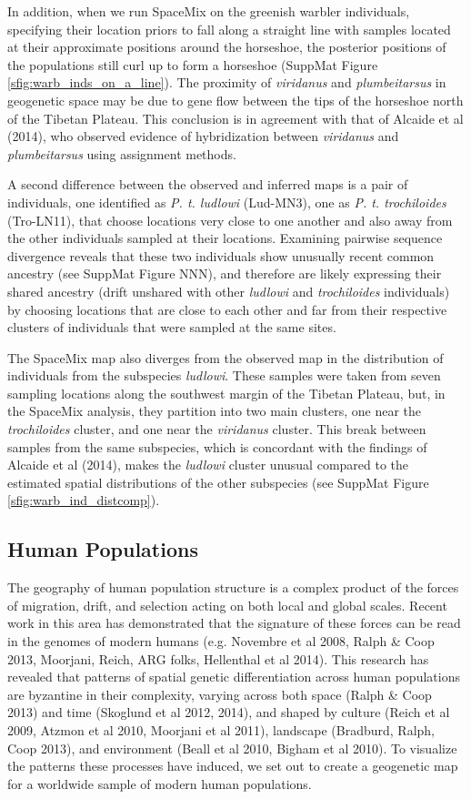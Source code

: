 \documentclass[12pt]{article}
\begin{document}
In addition, when we run SpaceMix on the greenish warbler individuals, specifying their location priors to fall along a straight line with samples located at their approximate positions around the horseshoe, the posterior positions of the populations still curl up to form a horseshoe (SuppMat Figure \ref{sfig:warb_inds_on_a_line}). The proximity of \textit{viridanus} and \textit{plumbeitarsus} in geogenetic space may be due to gene flow between the tips of the horseshoe north of the Tibetan Plateau. This conclusion is in agreement with that of Alcaide et al (2014), who observed evidence of hybridization between \textit{viridanus} and \textit{plumbeitarsus} using assignment methods.

A second difference between the observed and inferred maps is a pair of individuals, one identified as \textit{P. t. ludlowi} (Lud-MN3), one as \textit{P. t. trochiloides} (Tro-LN11), that choose locations very close to one another and also away from the other individuals sampled at their locations. Examining pairwise sequence divergence reveals that these two individuals show unusually recent common ancestry (see SuppMat Figure NNN), and therefore are likely expressing their shared ancestry (drift unshared with other \textit{ludlowi} and \textit{trochiloides} individuals) by choosing locations that are close to each other and far from their respective clusters of individuals that were sampled at the same sites.

The SpaceMix map also diverges from the observed map in the distribution of individuals from the subspecies \textit{ludlowi}.  These samples were taken from seven sampling locations along the southwest margin of the Tibetan Plateau, but, in the SpaceMix analysis, they partition into two main clusters, one near the \textit{trochiloides} cluster, and one near the \textit{viridanus} cluster.  This break between samples from the same subspecies, which is concordant with the findings of Alcaide et al (2014), makes the \textit{ludlowi} cluster unusual compared to the estimated spatial distributions of the other subspecies (see SuppMat Figure \ref{sfig:warb_ind_distcomp}).

%
\subsection*{Human Populations}
The geography of human population structure is a complex product of the forces of migration, drift, and selection acting on both local and global scales.  Recent work in this area has demonstrated that the signature of these forces can be read in the genomes of modern humans (e.g. Novembre et al 2008, Ralph \& Coop 2013, Moorjani, Reich, ARG folks, Hellenthal et al 2014).  This research has revealed that patterns of spatial genetic differentiation across human populations are byzantine in their complexity, varying across both space (Ralph \& Coop 2013) and time (Skoglund et al 2012, 2014), and shaped by culture (Reich et al 2009, Atzmon et al 2010, Moorjani et al 2011), landscape (Bradburd, Ralph, Coop 2013), and environment (Beall et al 2010, Bigham et al 2010).  To visualize the patterns these processes have induced, we set out to create a geogenetic map for a worldwide sample of modern human populations.  
\end{document}
